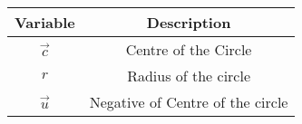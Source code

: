 \begin{center}
    \begin{tabular}{|c|c|} 
        \hline
            \textbf{Variable} & \textbf{Description} \\ 
        \hline
	    $\vec{c}$ & Centre of the Circle \\
        \hline
        ${r}$ & Radius of the circle\\
        \hline
	     $\vec{u}$ & Negative of Centre of the circle \\
        \hline
    \end{tabular}
\end{center}
